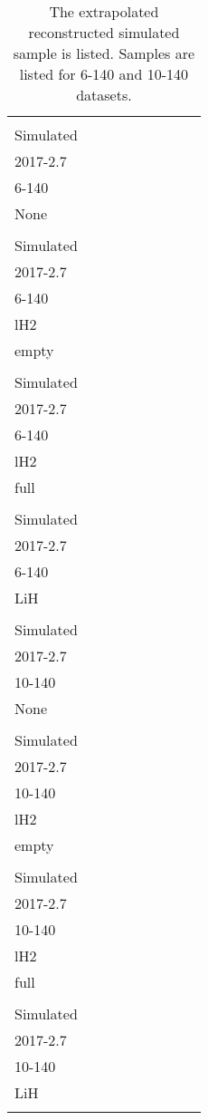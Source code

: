 \begin{landscape}
\begin{table}
\centering
\caption{The extrapolated reconstructed simulated sample is listed.  Samples are listed for 6-140 and 10-140 datasets.\label{tab:mc_cuts_summary_2_1}}
\begin{tabular}[pos]{l|cccccccc}
                                                   & \splitcell{\\Simulated\\2017-2.7\\6-140\\None\\} & \splitcell{\\Simulated\\2017-2.7\\6-140\\lH2\\empty\\} & \splitcell{\\Simulated\\2017-2.7\\6-140\\lH2\\full\\} & \splitcell{\\Simulated\\2017-2.7\\6-140\\LiH\\} & \splitcell{\\Simulated\\2017-2.7\\10-140\\None\\} & \splitcell{\\Simulated\\2017-2.7\\10-140\\lH2\\empty\\} & \splitcell{\\Simulated\\2017-2.7\\10-140\\lH2\\full\\} & \splitcell{\\Simulated\\2017-2.7\\10-140\\LiH\\} \\

\end{tabular}
\end{table}
\end{landscape}
